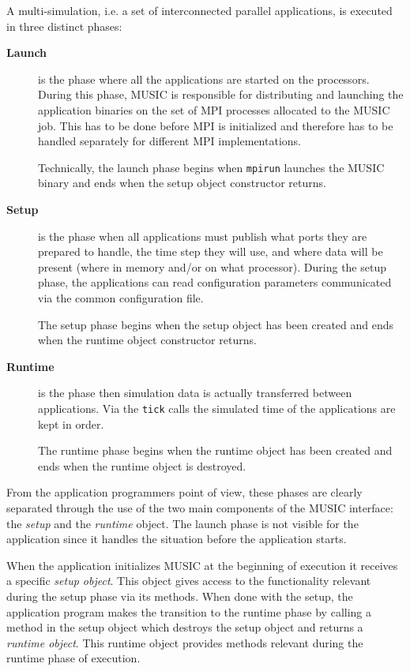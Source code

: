 \documentclass[a4paper]{report}
\begin{document}
A multi-simulation, i.e. a set of interconnected parallel
applications, is executed in three distinct phases:
\begin{description}
\item[\textbf{Launch}] is the phase where all the
  applications are started on the processors.  During this phase,
  MUSIC is responsible for distributing and launching the application
  binaries on the set of MPI processes allocated to the MUSIC job.
  This has to be done before MPI is initialized and therefore has to
  be handled separately for different MPI implementations.

  Technically, the launch phase begins when \texttt{mpirun} launches
  the MUSIC binary and ends when the setup object constructor returns.

\item[\textbf{Setup}] is the phase when all
  applications must publish what ports they are prepared to handle,
  the time step they will use, and where data will be present (where
  in memory and/or on what processor).  During the setup phase, the
  applications can read configuration parameters communicated via the
  common configuration file.

  The setup phase begins when the setup object has been created and
  ends when the runtime object constructor returns.

\item[\textbf{Runtime}] is the phase then
  simulation data is actually transferred between applications.  Via
  the \texttt{tick} calls the simulated time of the applications are
  kept in order.

  The runtime phase begins when the runtime object has been created
  and ends when the runtime object is destroyed.
\end{description}

From the application programmers point of view, these phases are
clearly separated through the use of the two main components of the
MUSIC interface: the \emph{setup} and the \emph{runtime} object.  The
launch phase is not visible for the application since it handles the
situation before the application starts.

When the application initializes MUSIC at the beginning of execution
it receives a specific \emph{setup object}.  This object gives access
to the functionality relevant during the setup phase via its methods.
When done with the setup, the application program makes the transition
to the runtime phase by calling a method in the setup object which
destroys the setup object and returns a \emph{runtime object}.  This
runtime object provides methods relevant during the runtime phase of
execution.
\end{document}
